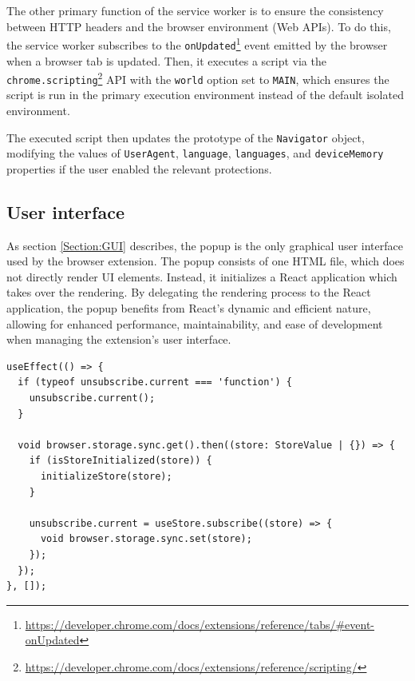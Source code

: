 The other primary function of the service worker is to ensure the consistency between HTTP headers and the browser environment (Web APIs). To do this, the service worker subscribes to the \texttt{onUpdated}\footnote{\url{https://developer.chrome.com/docs/extensions/reference/tabs/\#event-onUpdated}} event emitted by the browser when a browser tab is updated. Then, it executes a script via the \texttt{chrome.scripting}\footnote{\url{https://developer.chrome.com/docs/extensions/reference/scripting/}} API with the \texttt{world} option set to \texttt{MAIN}, which ensures the script is run in the primary execution environment instead of the default isolated environment.

The executed script then updates the prototype of the \texttt{Navigator} object, modifying the values of \texttt{UserAgent}, \texttt{language}, \texttt{languages}, and \texttt{deviceMemory} properties if the user enabled the relevant protections.

\subsection{User interface}

As section \ref{Section:GUI} describes, the popup is the only graphical user interface used by the browser extension. The popup consists of one HTML file, which does not directly render UI elements. Instead, it initializes a React application which takes over the rendering. By delegating the rendering process to the React application, the popup benefits from React's dynamic and efficient nature, allowing for enhanced performance, maintainability, and ease of development when managing the extension's user interface.

\bigbreak

\begin{lstlisting}[caption={A code snippet in which the React application initializes its storage and creates a subscription for future changes.}]
useEffect(() => {
  if (typeof unsubscribe.current === 'function') {
    unsubscribe.current();
  }

  void browser.storage.sync.get().then((store: StoreValue | {}) => {
    if (isStoreInitialized(store)) {
      initializeStore(store);
    }

    unsubscribe.current = useStore.subscribe((store) => {
      void browser.storage.sync.set(store);
    });
  });
}, []);
\end{lstlisting}

\medbreak


